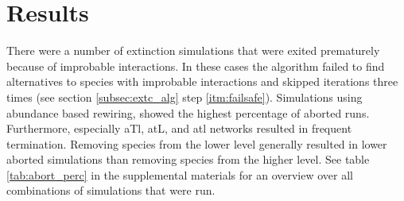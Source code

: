 \documentclass[12pt,a4paper]{article}
\begin{document}
\section{Results}
There were a number of extinction simulations that were exited prematurely because of improbable interactions. In these cases the algorithm failed to find alternatives to species with improbable interactions and skipped iterations three times (see section \ref{subsec:extc_alg} step \ref{itm:failsafe}). Simulations using abundance based rewiring, showed the highest percentage of aborted runs. Furthermore, especially aTl, atL, and atl networks resulted in frequent termination. Removing species from the lower level generally resulted in lower aborted simulations than removing species from the higher level. See table \ref{tab:abort_perc} in the supplemental materials for an overview over all combinations of simulations that were run.
\end{document}
